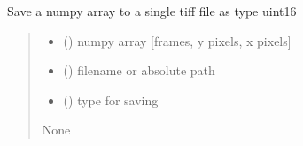 \documentclass[letterpaper,10pt,english]{sphinxmanual}
\begin{document}
\begin{fulllineitems}
\label{\detokenize{CalSciPy.io:CalSciPy.io.save_single_tiff}}
\pysigstartsignatures
{}
\pysigstopsignatures
\sphinxAtStartPar
Save a numpy array to a single tiff file as type uint16
\begin{quote}\begin{description}
\begin{itemize}
\item {} 
\sphinxAtStartPar
{} () \sphinxhyphen{}\sphinxhyphen{} numpy array {[}frames, y pixels, x pixels{]}

\item {} 
\sphinxAtStartPar
{} (\sphinxstyleliteralemphasis{\sphinxupquote{{[}}}\sphinxstyleliteralemphasis{\sphinxupquote{, }}\sphinxstyleliteralemphasis{\sphinxupquote{{]}}}) \sphinxhyphen{}\sphinxhyphen{} filename or absolute path

\item {} 
\sphinxAtStartPar
{} (\sphinxstyleliteralemphasis{\sphinxupquote{{[}}}\sphinxstyleliteralemphasis{\sphinxupquote{{]}}}) \sphinxhyphen{}\sphinxhyphen{} type for saving

\end{itemize}

\sphinxAtStartPar
None

\end{description}\end{quote}

\end{fulllineitems}

\end{document}
